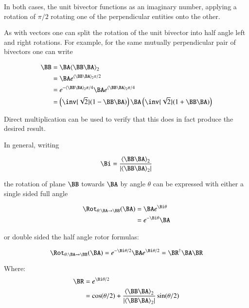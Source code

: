 In both cases, the unit bivector functions as an imaginary number, applying a rotation of $\pi/2$ rotating one of the perpendicular entities onto the other.

As with vectors one can split the rotation of the unit bivector into half angle left and right rotations.  For example, for the same mutually perpendicular pair of bivectors one can write

\begin{align*}
\BB 
&= \BA\gpgradetwo{\BB \BA} \\
&= \BA e^{\gpgradetwo{\BB \BA}\pi/2} \\
&= e^{-\gpgradetwo{\BB \BA}\pi/4} \BA e^{\gpgradetwo{\BB \BA}\pi/4} \\
&= \left(\inv{\sqrt{2}}(1 - \BB \BA)\right) \BA \left(\inv{\sqrt{2}}(1 + \BB \BA) \right) \\
\end{align*}

Direct multiplication can be used to verify that this does in fact produce the desired result.

In general, writing 

\begin{align*}
\Bi = \frac{\gpgradetwo{\BB \BA}}{\Abs{\gpgradetwo{\BB \BA}}}
\end{align*}

the rotation of plane $\BB$ towards $\BA$ by angle $\theta$ can be expressed with either a single sided full angle

\begin{align*}
\Rot_{\theta: \BA \rightarrow \BB}(\BA) 
&= \BA e^{\Bi \theta} \\
&= e^{-\Bi \theta} \BA \\
\end{align*}

or double sided the half angle rotor formulas:

\begin{equation}\label{eqn:bivector:rotor}
\Rot_{\theta: \BA \rightarrow \BB}(\BA) = e^{-\Bi \theta/2} \BA e^{\Bi \theta/2} = \BR^\dagger \BA \BR
\end{equation}

Where:
\begin{align*}
\BR 
&= e^{\Bi\theta/2} \\
&= \cos(\theta/2) + \frac{\gpgradetwo{\BB \BA}}{\Abs{\gpgradetwo{\BB \BA}}}\sin(\theta/2) \\
\end{align*}

